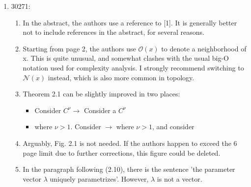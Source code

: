 \documentclass[letterpaper, 10 pt, conference, dvipsnames]{ieeeconf}
\begin{document}
\begin{enumerate}
\begin{enumerate}
        \begin{itemize}
            \item Theorem 2: “be be open subsets” 
            \item After (2.9): “and $f \in ...$” but referring to $\Phi$ in (2.9) and paragraph after (2.10) again refers to $f$. 
            \item Paragraph after (2.10) states $g \in \mathcal{C}^2$ but $\Phi \in \mathcal{C}^2$ was not assumed (which would be needed to get the exponent 2 from the ImFT) 
        \end{itemize}
    \end{enumerate}
    \item 30271:
    \begin{enumerate}
        \item In the abstract, the authors use a reference to [1]. It is generally better not to include references in the abstract, for several reasons. 
        \item Starting from page 2, the authors use $\mathcal{O}(x)$ to denote a neighborhood of x. This is quite unusual, and somewhat clashes with the usual big-O notation used for complexity analysis. I strongly recommend switching to $\mathcal{N}(x)$ instead, which is also more common in topology. 
        \item Theorem 2.1 can be slightly improved in two places:
        \begin{itemize} 
            \item Consider $C^\nu\to$ Consider a $C^\nu$
            \item where $\nu>1$. Consider $\to$ where $\nu>1$, and consider
        \end{itemize}
        \item Arguably, Fig. 2.1 is not needed. If the authors happen to exceed the 6 page limit due to further corrections, this figure could be deleted.
        \item In the paragraph following (2.10), there is the sentence 'the parameter vector $\lambda$ uniquely parametrizes'. However, $\lambda$ is not a vector. 

\end{enumerate}
\end{enumerate}
\end{document}
